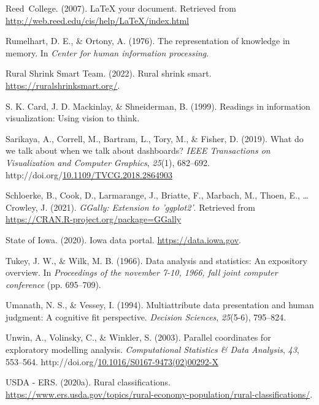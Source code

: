 \documentclass[print]{nuthesis}
\newlength{\cslhangindent}
\newenvironment{CSLReferences}[2]%
{\setlength{\parindent}{0pt}%
\everypar{\setlength{\hangindent}{\cslhangindent}}\ignorespaces}%
{\par}
\begin{document}
\begin{CSLReferences}{1}{0}
\leavevmode\hypertarget{ref-reedweb2007}{}%
Reed~College. (2007). LaTeX your document. Retrieved from \url{http://web.reed.edu/cis/help/LaTeX/index.html}

\leavevmode\hypertarget{ref-rumelhart1976}{}%
Rumelhart, D. E., \& Ortony, A. (1976). The representation of knowledge in memory. In \emph{Center for human information processing}.

\leavevmode\hypertarget{ref-scc}{}%
Rural Shrink Smart Team. (2022). Rural shrink smart. \url{https://ruralshrinksmart.org/}.

\leavevmode\hypertarget{ref-Card}{}%
S. K. Card, J. D. Mackinlay, \& Shneiderman, B. (1999). Readings in information visualization: Using vision to think.

\leavevmode\hypertarget{ref-fisher}{}%
Sarikaya, A., Correll, M., Bartram, L., Tory, M., \& Fisher, D. (2019). What do we talk about when we talk about dashboards? \emph{IEEE Transactions on Visualization and Computer Graphics}, \emph{25}(1), 682--692. http://doi.org/\href{https://doi.org/10.1109/TVCG.2018.2864903}{10.1109/TVCG.2018.2864903}

\leavevmode\hypertarget{ref-ggally}{}%
Schloerke, B., Cook, D., Larmarange, J., Briatte, F., Marbach, M., Thoen, E., \ldots{} Crowley, J. (2021). \emph{GGally: Extension to 'ggplot2'}. Retrieved from \url{https://CRAN.R-project.org/package=GGally}

\leavevmode\hypertarget{ref-iowa_gov}{}%
State of Iowa. (2020). Iowa data portal. \url{https://data.iowa.gov}.

\leavevmode\hypertarget{ref-tukey1966}{}%
Tukey, J. W., \& Wilk, M. B. (1966). Data analysis and statistics: An expository overview. In \emph{Proceedings of the november 7-10, 1966, fall joint computer conference} (pp. 695--709).

\leavevmode\hypertarget{ref-umanath1994}{}%
Umanath, N. S., \& Vessey, I. (1994). Multiattribute data presentation and human judgment: A cognitive fit perspective. \emph{Decision Sciences}, \emph{25}(5-6), 795--824.

\leavevmode\hypertarget{ref-unwin2003}{}%
Unwin, A., Volinsky, C., \& Winkler, S. (2003). Parallel coordinates for exploratory modelling analysis. \emph{Computational Statistics \& Data Analysis}, \emph{43}, 553--564. http://doi.org/\href{https://doi.org/10.1016/S0167-9473(02)00292-X}{10.1016/S0167-9473(02)00292-X}

\leavevmode\hypertarget{ref-Rural_classification}{}%
USDA - ERS. (2020a). Rural classifications. \url{https://www.ers.usda.gov/topics/rural-economy-population/rural-classifications/}.


\end{CSLReferences}
\end{document}
